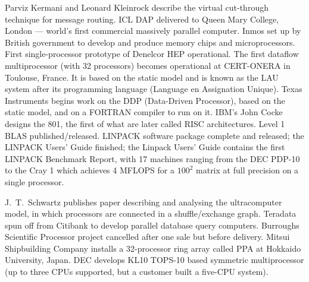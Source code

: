 	{Parviz Kermani and Leonard Kleinrock describe
	the virtual cut-through technique for message routing.}
	{ICL DAP delivered to Queen Mary College, London ---
	world's first commercial massively parallel computer.}
	{Inmos set up by British government to develop and produce
	memory chips and microprocessors.}
	{First single-processor prototype of Denelcor HEP operational.}
	{The first dataflow multiprocessor (with 32 processors)
	becomes operational at CERT-ONERA in Toulouse, France.
	It is based on the static model and is known as the LAU system
	after its programming language (Language en Assignation Unique).}
	{Texas Instruments begins work on the DDP (Data-Driven Processor),
	based on the static model,
	and on a FORTRAN compiler to run on it.}
	{IBM's John Cocke designs the 801,
	the first of what are later called RISC architectures.}
        {Level 1 BLAS published/released.
        LINPACK software package complete and released; the LINPACK
        Users' Guide finished; the Linpack Users' Guide contains the
        first LINPACK Benchmark Report, with 17 machines ranging from
	the DEC PDP-10 to the Cray 1
	which achieves 4 MFLOPS for a $100^2$ matrix
	at full precision on a single processor.}

	{J.~T.\ Schwartz publishes paper describing and analysing
	the ultracomputer model,
	in which processors are connected in a shuffle/exchange graph.}
	{Teradata spun off from Citibank to develop
	parallel database query computers.}
	{Burroughs Scientific Processor project cancelled
	after one sale but before delivery.}
	{Mitsui Shipbuilding Company installs
	a 32-processor ring array called PPA
	at Hokkaido University, Japan.}
	{DEC develops KL10 TOPS-10 based symmetric multiprocessor
	(up to three CPUs supported,
	but a customer built a five-CPU system).}

